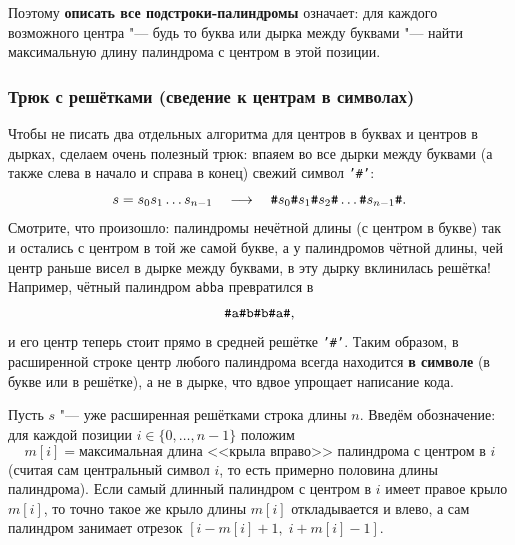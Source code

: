 Поэтому \textbf{описать все подстроки-палиндромы} означает: для каждого возможного центра "--- будь то буква или дырка между буквами "--- найти максимальную длину палиндрома с центром в этой позиции.

\subsubsection*{Трюк с решётками (сведение к центрам в символах)}

Чтобы не писать два отдельных алгоритма для центров в буквах и центров в дырках, сделаем очень полезный трюк: впаяем во все дырки между буквами (а также слева в начало и справа в конец) свежий символ \texttt{'\#'}:
\[
    s = s_0 s_1 \dots s_{n-1} \quad \longrightarrow \quad \text{\texttt{\#}} s_0 \text{\texttt{\#}} s_1 \text{\texttt{\#}} s_2 \text{\texttt{\#}} \dots \text{\texttt{\#}} s_{n-1} \text{\texttt{\#}}.
\]
Смотрите, что произошло: палиндромы нечётной длины (с центром в букве) так и остались с центром в той же самой букве, а у палиндромов чётной длины, чей центр раньше висел в дырке между буквами, в эту дырку вклинилась решётка! Например, чётный палиндром \texttt{abba} превратился в
\[
    \text{\texttt{\#a\#b\#b\#a\#}},
\]
и его центр теперь стоит прямо в средней решётке \texttt{'\#'}. Таким образом, в расширенной строке центр любого палиндрома всегда находится \textbf{в символе} (в букве или в решётке), а не в дырке, что вдвое упрощает написание кода.

Пусть $s$ "--- уже расширенная решётками строка длины $n$. Введём обозначение: для каждой позиции $i \in \{0, \dots, n - 1\}$ положим
\[
    m[i] = \text{максимальная длина <<крыла вправо>> палиндрома с центром в } i
\]
(считая сам центральный символ $i$, то есть примерно половина длины палиндрома). Если самый длинный палиндром с центром в $i$ имеет правое крыло $m[i]$, то точно такое же крыло длины $m[i]$ откладывается и влево, а сам палиндром занимает отрезок $[i - m[i] + 1,\; i + m[i] - 1]$.

\begin{center}
\end{center}

